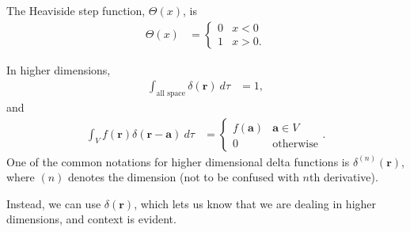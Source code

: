 \documentclass[10pt]{mypackage}
\begin{document}
\begin{example}
The Heaviside step function, $\Theta(x)$, is
\begin{align*}
  \Theta(x) &= \begin{cases}
    0 & x < 0\\
    1 & x > 0.
  \end{cases}
\end{align*}
\begin{center}
\end{center}
\end{example}
\begin{example}
  In higher dimensions,
  \begin{align*}
    \int_{\text{all space}}^{} \delta\!\left(\mathbf{r}\right)\:d\tau &= 1,
  \end{align*}
  and
  \begin{align*}
    \int_{V}^{} f\left(\mathbf{r}\right)\delta\!\left(\mathbf{r}-\mathbf{a}\right)\:d\tau &= \begin{cases}
      f\left(\mathbf{a}\right) & \mathbf{a}\in V\\
      0 & \text{otherwise}
    \end{cases}.
  \end{align*}
  One of the common notations for higher dimensional delta functions is $\delta^{(n)}\left(\mathbf{r}\right)$, where $(n)$ denotes the dimension (not to be confused with $n$th derivative).\newline

  Instead, we can use $\delta\!\left(\mathbf{r}\right)$, which lets us know that we are dealing in higher dimensions, and context is evident.
\end{example}
\end{document}
